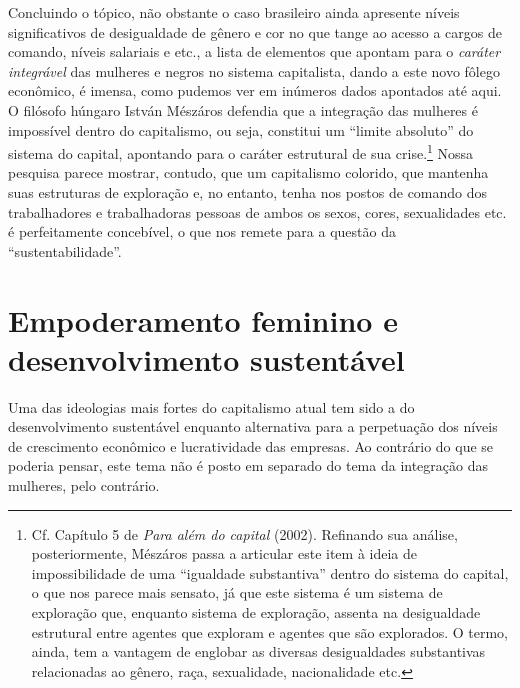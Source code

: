 Concluindo o tópico, não obstante o caso brasileiro ainda apresente
níveis significativos de desigualdade de gênero e cor no que tange ao
acesso a cargos de comando, níveis salariais e etc., a lista de
elementos que apontam para o \emph{caráter integrável} das mulheres e
negros no sistema capitalista, dando a este novo fôlego econômico, é
imensa, como pudemos ver em inúmeros dados apontados até aqui. O
filósofo húngaro István Mészáros defendia que a integração das mulheres
é impossível dentro do capitalismo, ou seja, constitui um ``limite
absoluto'' do sistema do capital, apontando para o caráter estrutural de
sua crise.\footnote{Cf. Capítulo 5 de \emph{Para além do capital}
  (2002). Refinando sua análise, posteriormente, Mészáros passa a
  articular este item à ideia de impossibilidade de uma ``igualdade
  substantiva'' dentro do sistema do capital, o que nos parece mais
  sensato, já que este sistema é um sistema de exploração que, enquanto
  sistema de exploração, assenta na desigualdade estrutural entre
  agentes que exploram e agentes que são explorados. O termo, ainda, tem
  a vantagem de englobar as diversas desigualdades substantivas
  relacionadas ao gênero, raça, sexualidade, nacionalidade etc.} Nossa
pesquisa parece mostrar, contudo, que um capitalismo colorido, que
mantenha suas estruturas de exploração e, no entanto, tenha nos postos
de comando dos trabalhadores e trabalhadoras pessoas de ambos os sexos,
cores, sexualidades etc. é perfeitamente concebível, o que nos remete
para a questão da ``sustentabilidade''.

\chapter[Empoderamento feminino e desenvolvimento sustentável]{Empoderamento feminino e \break desenvolvimento sustentável}

Uma das ideologias mais fortes do capitalismo atual tem sido a do
desenvolvimento sustentável enquanto alternativa para a perpetuação dos
níveis de crescimento econômico e lucratividade das empresas. Ao
contrário do que se poderia pensar, este tema não é posto em separado do
tema da integração das mulheres, pelo contrário.

